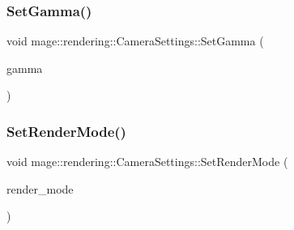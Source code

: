 \hypertarget{classmage_1_1rendering_1_1_camera_settings_aff3d5727eaff77fd9f8bb30d352ff7d7}{}\label{classmage_1_1rendering_1_1_camera_settings_aff3d5727eaff77fd9f8bb30d352ff7d7} 
\subsubsection{\texorpdfstring{Set\+Gamma()}{SetGamma()}}
{\footnotesize\ttfamily void mage\+::rendering\+::\+Camera\+Settings\+::\+Set\+Gamma (\begin{DoxyParamCaption}\item[{\hyperlink{namespacemage_aa97e833b45f06d60a0a9c4fc22ae02c0}{F32}}]{gamma }\end{DoxyParamCaption})\hspace{0.3cm}{\ttfamily [noexcept]}}

\hypertarget{classmage_1_1rendering_1_1_camera_settings_aa4f29b081141c0acfb0e4d92eac81602}{}\label{classmage_1_1rendering_1_1_camera_settings_aa4f29b081141c0acfb0e4d92eac81602} 
\subsubsection{\texorpdfstring{Set\+Render\+Mode()}{SetRenderMode()}}
{\footnotesize\ttfamily void mage\+::rendering\+::\+Camera\+Settings\+::\+Set\+Render\+Mode (\begin{DoxyParamCaption}\item[{\hyperlink{namespacemage_1_1rendering_aeb14ce7610cc9391f4e01be027b91dcc}{Render\+Mode}}]{render\+\_\+mode }\end{DoxyParamCaption})\hspace{0.3cm}{\ttfamily [noexcept]}}

\hypertarget{classmage_1_1rendering_1_1_camera_settings_ab5dc52d8f8d92cf3c4f6aca126f6dc47}{}\label{classmage_1_1rendering_1_1_camera_settings_ab5dc52d8f8d92cf3c4f6aca126f6dc47} 
